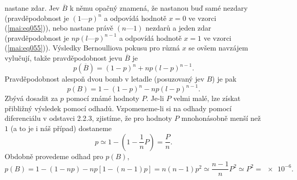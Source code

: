 \begin{example}
  nastane zdar. Jev \(\overline{B}\) k němu opačný znamená, že nastanou buď samé nezdary 
  (pravděpodobnost je \((1 — p)^n\) a odpovídá hodnotě \(x = 0\) ve vzorci (\ref{mai:eq055})), nebo 
  nastane právě \((n — 1)\) nezdarů a jeden zdar (pravděpodobnost je \(np(l — p)^{n-1}\) a odpovídá 
  hodnotě \(x = 1\) ve vzorci (\ref{mai:eq055})). Výsledky Bernoulliova pokusu pro různá \(x\) se 
  ovšem navzájem vylučují, takže pravděpodobnost jevu \(\overline{B}\) je
  \begin{equation*}
    p(\overline{B}) = (1 - p)^n + np(l - p)^{n-1}.
  \end{equation*}
  Pravděpodobnost alespoň dvou bomb v letadle (posuzovaný jev \(B\)) je pak
  \begin{equation*}
    p(B) = 1 - (1 - p)^n - np(l - p)^{n-1}.
  \end{equation*}
  Zbývá dosadit za \(p\) pomocí známé hodnoty \(P\). Je-li \(P\) velmi malé, lze získat přibližný 
  výsledek pomocí odhadů. Vzpomeneme-li si na odhady pomocí diferenciálu v odstavci 2.2.3, 
  zjistíme, že pro hodnoty \(P\) mnohonásobně menší než \(1\) (a to je i náš případ) dostaneme
  \begin{equation*}
    p \simeq 1 - \left(1 - \dfrac{1}{n}P\right) = \dfrac{P}{n}.
  \end{equation*}
  Obdobně provedeme odhad pro \(p(B)\),
  \begin{equation*}
    p(B) = 1 - (1 - np) - np\left[1 - (n - 1)p\right] = n(n - 1)p^2 \simeq \dfrac{n-1}{n}P^2 
         \simeq P^2 = \num{e-6}.
  \end{equation*}
\normalsize
\end{example}